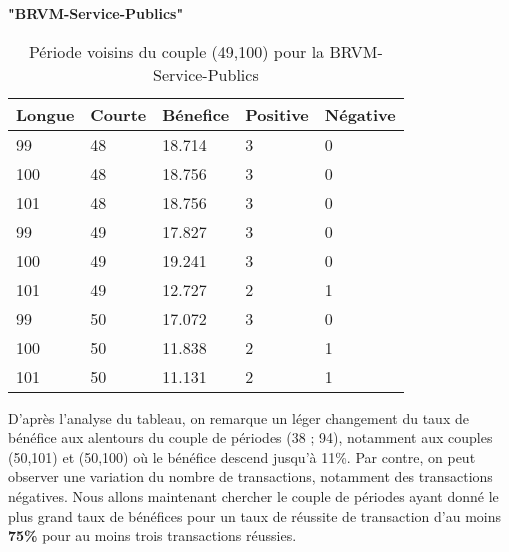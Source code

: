 \begin{itemize}
\begin{itemize}
\begin{center}
    \textbf{"BRVM-Service-Publics" }
\end{center}
\begin{table}[ht]
    \centering
    \caption{Période voisins du couple (49,100) pour la BRVM-Service-Publics}
    \begin{tabular}{p{2cm}p{2cm}p{2cm}p{2cm}p{1.5cm}}
        \hline
        Longue & Courte & Bénefice & Positive &Négative \\ 
        \hline
        99	    &48	&18.714	&3	&0	\\ 
        100	&48	&18.756	&3	&0	    \\ 
        101	&48	&18.756	&3	&0	    \\ 
        99	    &49	&17.827	&3	&0	\\ \hline
        \cellcolor{myblue}100	&\cellcolor{myblue}49	&\cellcolor{myblue}19.241	&\cellcolor{myblue}3	&\cellcolor{myblue}0	    \\ \hline
        101	&49	&12.727	&2	&1	    \\ 
        99	    &50	&17.072	&3	&0	\\ 
        100	&50	&11.838	&2	&1	    \\ 
        101	&50	&11.131	&2	&1	    \\  
            \hline
    \end{tabular}
\end{table}%
\par{D'après l'analyse du tableau, on remarque un léger changement du taux de bénéfice aux alentours du couple 
de périodes (38 ; 94), notamment aux couples (50,101) et (50,100) où le 
bénéfice descend jusqu'à 11\%. Par contre, on peut observer une variation 
du nombre de transactions, notamment des transactions négatives. Nous allons
maintenant chercher le couple de périodes ayant donné le plus grand taux de bénéfices pour un 
taux de réussite de transaction d'au moins \textbf{75\%} pour au moins trois transactions réussies.}


\end{itemize}
\end{itemize}
